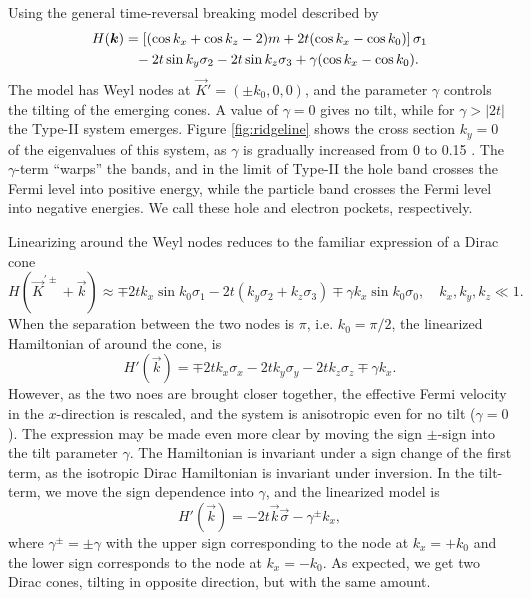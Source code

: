 Using the general time-reversal breaking model described by \textcite{mccormickMinimalModelsTopological2017}
\begin{equation}
  \begin{split}
    H(\vec{k}) &= \left[ ( \cos k_x + \cos k_z - 2 )m + 2 t (\cos k_x - \cos k_0) \right] \sigma_1\\
    &\pe - 2 t \sin k_y \sigma_2 - 2t \sin k_z \sigma_3
    + \gamma (\cos k_x - \cos k_0).
  \end{split}
\end{equation}
The model has Weyl nodes at \(\vec{K}' = (\pm k_{0}, 0,0)\), and the parameter $\gamma$ controls the tilting of the emerging cones.
A value of $\gamma=0$ gives no tilt, while for $\gamma > |2 t|$ the Type-II system emerges.
Figure \ref{fig:ridgeline} shows the cross section \(k_{y} = 0\) of the eigenvalues of this system, as \(\gamma\) is gradually increased from 0 to 0.15 .
The \(\gamma\)-term ``warps'' the bands, and in the limit of Type-II the hole band crosses the Fermi level into positive energy, while the particle band crosses the Fermi level into negative energies.
We call these hole and electron pockets, respectively.

Linearizing around the Weyl nodes reduces to the familiar expression of a Dirac cone
\begin{equation}
  \label{eq:7}
  H(\vec{K} ^{'\pm} + \vec{k}) \approx \mp 2 t k_{x} \sin k_{0} \sigma_{1} - 2 t (k_{y} \sigma_{2} + k_{z} \sigma_{3}) \mp \gamma k_{x} \sin k_{0} \sigma_{0}, \quad k_{x}, k_{y}, k_{z} \ll 1.
\end{equation}
When the separation between the two nodes is \(\pi\), i.e. \(k_{0} = \pi/ 2 \), the linearized Hamiltonian of around the cone, is
\begin{equation}
  \label{eq:8}
  H'(\vec{k}) = \mp 2 t k_{x} \sigma_{x} - 2t k_{y} \sigma_{y} - 2 t k_{z} \sigma_{z} \mp \gamma k_{x}.
\end{equation}
However, as the two noes are brought closer together, the effective Fermi velocity in the \(x\)-direction is rescaled, and the system is anisotropic even for no tilt (\(\gamma=0\)).
The expression may be made even more clear by moving the sign \(\pm\)-sign into the tilt parameter \(\gamma\).
The Hamiltonian is invariant under a sign change of the first term, as the isotropic Dirac Hamiltonian is invariant under inversion.
In the tilt-term, we move the sign dependence into \(\gamma \), and the linearized model is
\begin{equation}
  \label{eq:9}
  H'(\vec{k}) = - 2t \vec{k} \vec{\sigma} - \gamma^{\pm} k_{x},
\end{equation}
where \(\gamma ^{\pm} = \pm \gamma \) with the upper sign corresponding to the node at \(k_{x} = + k_{0}\) and the lower sign corresponds to the node at \(k_{x} = - k_{0}\).
As expected, we get two Dirac cones, tilting in opposite direction, but with the same amount.

